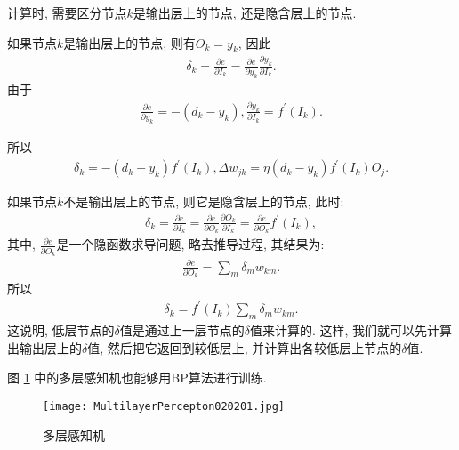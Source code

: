 \begin{remark}
  计算时, 需要区分节点$k$是输出层上的节点, 还是隐含层上的节点.

 如果节点$k$是输出层上的节点, 则有$O_k=y_k$, 因此
\begin{align*}
    \delta_{k}=\frac{\partial e}{\partial I_{k}}=\frac{\partial e}{\partial y_{k}} \frac{\partial y_{k}}{\partial I_{k}}.
\end{align*}
由于
\begin{align*}
    \frac{\partial e}{\partial y_{k}}=-\left (d_{k}-y_{k}\right), \frac{\partial y_{k}}{\partial I_{k}}=f^{\prime}\left (I_{k}\right).
\end{align*}

所以
\begin{align*}
    \delta_{k}=-\left (d_{k}-y_{k}\right) f^{\prime}\left (I_{k}\right), \Delta w_{j k}=\eta\left (d_{k}-y_{k}\right) f^{\prime}\left (I_{k}\right) O_{j}.
\end{align*}

 如果节点$k$不是输出层上的节点, 则它是隐含层上的节点, 此时:
\begin{align*}
    \delta_{k}=\frac{\partial e}{\partial I_{k}}=\frac{\partial e}{\partial O_{k}} \frac{\partial O_{k}}{\partial I_{k}}=\frac{\partial e}{\partial O_{k}} f^{\prime}\left (I_{k}\right),
\end{align*}
其中, $\frac{\partial e}{\partial O_{k}}$是一个隐函数求导问题, 略去推导过程, 其结果为:
\begin{align*}
    \frac{\partial e}{\partial O_{k}}=\sum_{m} \delta_{m} w_{k m}.
\end{align*}
所以
\begin{align*}
    \delta_{k}=f^{\prime}\left (I_{k}\right) \sum_{m} \delta_{m} w_{k m}.
\end{align*}
这说明, 低层节点的$\delta$值是通过上一层节点的$\delta$值来计算的.
这样, 我们就可以先计算出输出层上的$\delta$值, 然后把它返回到较低层上, 并计算出各较低层上节点的$\delta$值.
\end{remark}

图 \ref{MultilayerPercepton020201} 中的多层感知机也能够用BP算法进行训练.
\begin{figure}[H]
    \centering
    \texttt{[image: MultilayerPercepton020201.jpg]}
    \caption{多层感知机}
    \label{MultilayerPercepton020201}
\end{figure}

